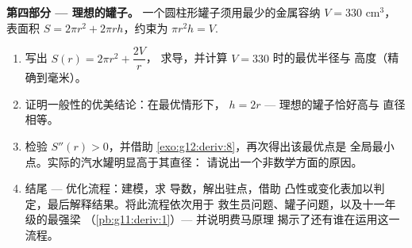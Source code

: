 \begin{problem}
\medskip
\noindent\textbf{第四部分 --- 理想的罐子。}
一个圆柱形罐子须用最少的金属容纳 $V = 330$ cm$^3$，
表面积 $S = 2\pi r^2 + 2\pi r h$，约束为
$\pi r^2 h = V$.
\begin{enumerate}[resume]
  \item 写出 $S(r) = 2\pi r^2 + \dfrac{2V}{r}$，
        求导，并计算 $V = 330$ 时的最优半径与
        高度（精确到毫米）。
  \item 证明一般性的优美结论：在最优情形下，
        $h = 2r$ --- 理想的罐子恰好高与
        直径相等。
  \item 检验 $S''(r) > 0$，并借助
        \cref{exo:g12:deriv:8}，再次得出该最优点是
        全局最小点。实际的汽水罐明显高于其直径：
        请说出一个非数学方面的原因。
  \item 结尾 --- 优化流程：建模，求
        导数，解出驻点，借助
        凸性或变化表加以判定，最后解释结果。将此流程依次用于
        救生员问题、罐子问题，以及十一年级的最强梁
        （\cref{pb:g11:deriv:1}）--- 并说明费马原理
        揭示了还有谁在运用这一流程。
\end{enumerate}
\end{problem}
